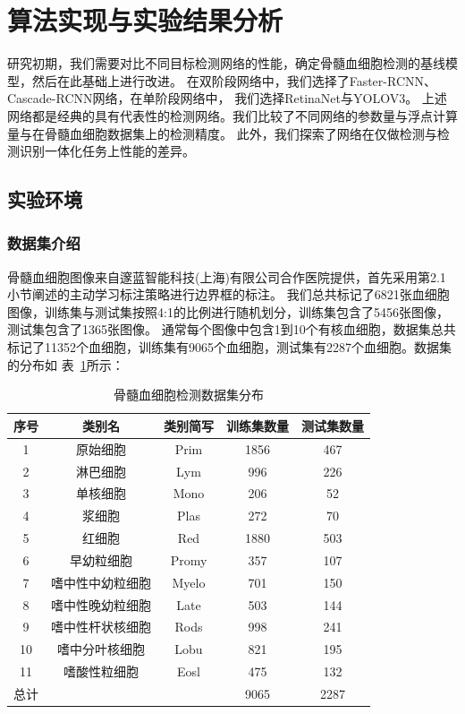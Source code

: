 \section{算法实现与实验结果分析}

研究初期，我们需要对比不同目标检测网络的性能，确定骨髓血细胞检测的基线模型，然后在此基础上进行改进。
在双阶段网络中，我们选择了Faster-RCNN\cite{ren2015faster}、Cascade-RCNN\cite{cai2018cascade}网络，在单阶段网络中，
我们选择RetinaNet\cite{lin2017focal}与YOLOV3\cite{redmon2018yolov3}。
上述网络都是经典的具有代表性的检测网络。我们比较了不同网络的参数量与浮点计算量与在骨髓血细胞数据集上的检测精度。
此外，我们探索了网络在仅做检测与检测识别一体化任务上性能的差异。

\subsection{实验环境}

\subsubsection{数据集介绍}
\label{section:dataset}

骨髓血细胞图像来自邃蓝智能科技(上海)有限公司合作医院提供，首先采用第2.1小节阐述的主动学习标注策略进行边界框的标注。
我们总共标记了6821张血细胞图像，训练集与测试集按照4:1的比例进行随机划分，训练集包含了5456张图像，测试集包含了1365张图像。
通常每个图像中包含1到10个有核血细胞，数据集总共标记了11352个血细胞，训练集有9065个血细胞，测试集有2287个血细胞。数据集的分布如
表~\ref{table:cell_detect}所示：

\begin{table}[htbp]
  \caption{骨髓血细胞检测数据集分布}   
  \centering 
  \label{table:cell_detect}
  \begin{tabular}{ccccc}
    \toprule[2pt]
    序号 & 类别名  &  类别简写 & 训练集数量 & 测试集数量 \\
    \midrule[1.5pt] 
    1 & 原始细胞 & Prim & 1856 & 467 \\ 
    2 & 淋巴细胞 & Lym & 996 & 226   \\ 
    3 & 单核细胞 & Mono & 206 & 52   \\ 
    4 & 浆细胞 & Plas & 272 & 70   \\ 
    5 & 红细胞 & Red & 1880 & 503   \\ 
    6 & 早幼粒细胞 & Promy & 357 & 107   \\ 
    7 & 嗜中性中幼粒细胞 & Myelo & 701 & 150   \\ 
    8 & 嗜中性晚幼粒细胞 & Late & 503 & 144   \\ 
    9 & 嗜中性杆状核细胞 & Rods & 998 & 241   \\  
    10 & 嗜中分叶核细胞 & Lobu & 821 & 195   \\  
    11 & 嗜酸性粒细胞 & Eosl & 475 & 132   \\  
    \hline
    总计 &   &   & 9065 & 2287 \\
    \bottomrule[2pt]      
  \end{tabular} 
\end{table}

